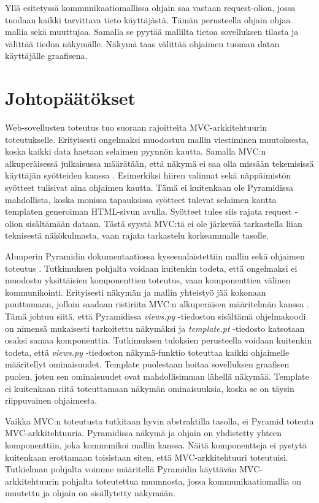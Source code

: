 \documentclass[finnish,utf8,nonumbib,palatino,kandi]{gradu2}
\begin{document}
Yllä esitetyssä kommunikaatiomallissa ohjain saa vastaan request-olion, jossa tuodaan kaikki tarvittava tieto käyttäjästä. Tämän perusteella ohjain ohjaa mallia
sekä muuttujaa. Samalla se pyytää mallilta tietoa sovelluksen tilasta ja välittää tiedon näkymälle. Näkymä taas välittää ohjaimen tuoman datan käyttäjälle graafisena.

\section{Johtopäätökset}
Web-sovellusten toteutus tuo suoraan rajoitteita MVC-arkkitehtuurin toteutukselle. Erityisesti ongelmaksi muodostuu mallin viestiminen muutoksesta, koska kaikki data haetaan selaimen pyynnön kautta. Samalla MVC:n alkuperäisessä julkaisussa määrätään, että näkymä ei saa olla missään tekemisissä käyttäjän syötteiden kanssa \cite[s. 1]{Reenskaug:orig}. Esimerkiksi hiiren valinnat sekä näppäimistön syötteet tulisivat aina ohjaimen kautta. Tämä ei kuitenkaan ole Pyramidissa mahdollista, koska monissa tapauksissa syötteet tulevat selaimen kautta
templaten generoiman HTML-sivun avulla. Syötteet tulee siis rajata request -olion sisältämään dataan.
Tästä syystä MVC:tä ei ole järkevää tarkastella liian teknisestä näkökulmasta, vaan rajata tarkastelu korkeammalle tasolle.

Alunperin Pyramidin dokumentaatiossa kyseenalaistettiin mallin sekä ohjaimen toteutus \cite{Pyramid:intr}. Tutkimuksen pohjalta voidaan kuitenkin
todeta, että ongelmaksi ei muodostu yksittäisien komponenttien toteutus, vaan komponenttien välinen kommunikointi. Erityisesti näkymän ja mallin yhteistyö jää
kokonaan puuttumaan, jolloin saadaan ristiriita MVC:n alkuperäisen määritelmän kanssa \cite[s. 1]{Reenskaug:orig}. Tämä johtuu siitä, että Pyramidissa \emph{views.py} -tiedoston sisältämä ohjelmakoodi on nimensä mukaisesti tarkoitettu näkymäksi ja
\emph{template.pt} -tiedosto katsotaan osaksi samaa komponenttia. Tutkimuksen tuloksien perusteella voidaan kuitenkin todeta, että \emph{views.py} -tiedoston näkymä-funktio toteuttaa kaikki
ohjaimelle määritellyt ominaisuudet. Template puolestaan hoitaa sovelluksen graafisen puolen, joten sen ominaisuudet ovat mahdollisimman lähellä näkymää. Template ei kuitenkaan riitä toteuttamaan näkymän ominaisuuksia, koska se on täysin riippuvainen ohjaimesta. 

Vaikka MVC:n toteutusta tutkitaan hyvin abstraktilla tasolla, ei Pyramid toteuta MVC-arkkitehtuuria. Pyramidissa näkymä ja ohjain on yhdistetty yhteen komponenttiin, joka kommunikoi mallin kanssa. Näitä komponentteja ei pystytä kuitenkaan erottamaan toisistaan siten, että MVC-arkkitehtuuri toteutuisi. Tutkielman pohjalta voimme määritellä Pyramidin käyttävän MVC-arkkitehtuurin pohjalta toteutettua muunnosta, jossa kommunikaatiomallia on muutettu ja ohjain on sisällytetty näkymään. 
\end{document}
